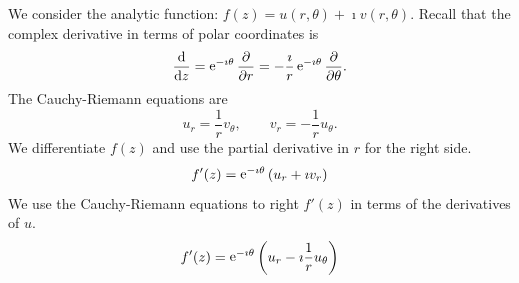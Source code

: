 {%
\begin{Solution}
  We consider the analytic function: $f(z) = u(r, \theta) + \imath v(r, \theta)$.
  Recall that the complex derivative in terms of polar coordinates is
  \[
  \frac{\mathrm{d}}{\mathrm{d} z} = \mathop{\mathrm{e}}\nolimits^{-\imath \theta} \frac{\partial}{\partial r} 
  = - \frac{\imath}{r} \mathop{\mathrm{e}}\nolimits^{-\imath \theta} \frac{\partial}{\partial \theta}.
  \]
  The Cauchy-Riemann equations are
  \[
  u_r = \frac{1}{r} v_\theta, \qquad v_r = - \frac{1}{r} u_\theta.
  \]
  We differentiate $f(z)$ and use the partial derivative in $r$ 
  for the right side.
  \[
  f'(z) = \mathop{\mathrm{e}}\nolimits^{-\imath \theta} \left( u_r + \imath v_r \right)
  \]
  We use the Cauchy-Riemann equations to right $f'(z)$ in terms of the 
  derivatives of $u$.
  \begin{equation}
    \label{eqn_fpz_emiturut}
    f'(z) = \mathop{\mathrm{e}}\nolimits^{-\imath \theta} \left( u_r - \imath \frac{1}{r} u_\theta \right)
  \end{equation}


\end{Solution}}
